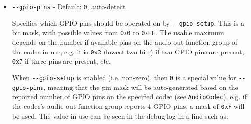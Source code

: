 \documentclass[]{article}
\providecommand{\tightlist}{%
  \setlength{\itemsep}{0pt}\setlength{\parskip}{0pt}}
\begin{document}
\begin{itemize}
  \begin{itemize}
  \tightlist
    \item \texttt{0x00000001} (bit \texttt{0}) --- \texttt{GPIO\_SETUP\_STAGE\_DATA},
    set GPIO pin data high on specified pins. Required e.g. on \texttt{MacBookPro10,2} and \texttt{MacPro5,1}.
    \item \texttt{0x00000002} (bit \texttt{1}) --- \texttt{GPIO\_SETUP\_STAGE\_DIRECTION},
    set GPIO data direction to output on specified pins. Required e.g. on \texttt{MacPro5,1}.
    \item \texttt{0x00000004} (bit \texttt{2}) --- \texttt{GPIO\_SETUP\_STAGE\_ENABLE},
    enable specified GPIO pins. Required e.g. on \texttt{MacPro5,1}.
  \end{itemize} \medskip

  If audio appears to be `playing' on the correct codec, e.g. based on the debug log, but no
  sound is heard on any channel, it is suggested to use \texttt{-{}-gpio-setup} (with no
  value) in the AudioDxe driver arguments. If specified with no value, all
  stages will be enabled (equivalent of specifying \texttt{7}). If this produces sound,
  it is then possible to try fewer bits, e.g. \texttt{-{}-gpio-setup=1}, \texttt{-{}-gpio-setup=3},
  to find out which stages are actually required. \medskip

  \emph{Note}: Value \texttt{7} (all flags enabled) of this option -- as required for the
  \texttt{MacPro5,1} -- is compatible with most systems, but is known to cause problems with
  sound (previous sounds are not allowed to finish before new sounds start) on a small number
  of other systems, hence this option is not enabled by default. \medskip

  \item \texttt{-{}-gpio-pins} - Default: \texttt{0}, auto-detect. \medskip

  Specifies which GPIO pins should be operated on by \texttt{-{}-gpio-setup}. This is a bit mask,
  with possible values from \texttt{0x0} to \texttt{0xFF}. The usable maximum depends on
  the number if available pins on the audio out function group of the codec in use, e.g. it is
  \texttt{0x3} (lowest two bits) if two GPIO pins are present, \texttt{0x7} if three pins are present,
  etc. \medskip

  When \texttt{-{}-gpio-setup} is enabled (i.e. non-zero), then \texttt{0} is a special
  value for \texttt{-{}-gpio-pins}, meaning that the pin mask will be auto-generated based on the
  reported number of GPIO pins on the specified codec (see \texttt{AudioCodec}), e.g. if the
  codec's audio out function group reports 4 GPIO pins, a mask of \texttt{0xF} will be used.
  The value in use can be seen in the debug log in a line such as: \medskip


\end{itemize}
\end{document}

